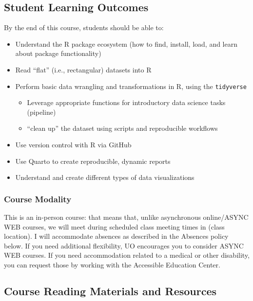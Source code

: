 \documentclass[
  letterpaper,
  DIV=11,
  numbers=noendperiod]{scrartcl}
\providecommand{\tightlist}{%
  \setlength{\itemsep}{0pt}\setlength{\parskip}{0pt}}\usepackage{longtable,booktabs,array}
\begin{document}
\hypertarget{student-learning-outcomes}{%
\subsection{Student Learning Outcomes}\label{student-learning-outcomes}}

By the end of this course, students should be able to:

\begin{itemize}
\tightlist
\item
  Understand the R package ecosystem (how to find, install, load, and
  learn about package functionality)
\item
  Read ``flat'' (i.e., rectangular) datasets into R
\item
  Perform basic data wrangling and transformations in R, using the
  \texttt{tidyverse}

  \begin{itemize}
  \tightlist
  \item
    Leverage appropriate functions for introductory data science tasks
    (pipeline)
  \item
    ``clean up'' the dataset using scripts and reproducible workflows
  \end{itemize}
\item
  Use version control with R via GitHub
\item
  Use Quarto to create reproducible, dynamic reports
\item
  Understand and create different types of data visualizations
\end{itemize}

\hypertarget{course-modality}{%
\subsubsection{Course Modality}\label{course-modality}}

This is an in-person course: that means that, unlike asynchronous
online/ASYNC WEB courses, we will meet during scheduled class meeting
times in (class location). I will accommodate absences as described in
the Absences policy below. If you need additional flexibility, UO
encourages you to consider ASYNC WEB courses. If you need accommodation
related to a medical or other disability, you can request those by
working with the Accessible Education Center.

\hypertarget{course-reading-materials-and-resources}{%
\subsection{Course Reading Materials and
Resources}\label{course-reading-materials-and-resources}}
\end{document}
